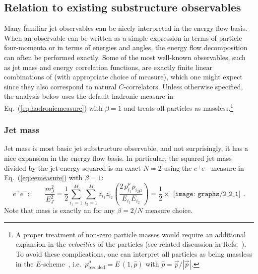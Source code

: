 \documentclass[letterpaper,11pt]{article}
\DeclareRobustCommand{\Eq}[1]{Eq.~(\ref{#1})}
\DeclareRobustCommand{\Refs}[1]{Refs.~\cite{#1}}
\newcommand{\B}{\text{EFP}\xspace}
\newcommand{\Bs}{\text{EFPs}\xspace}
\begin{document}
\subsection{Relation to existing substructure observables}
\label{sec:jetobs}

Many familiar jet observables can be nicely interpreted in the energy flow basis.
%
When an observable can be written as a simple expression in terms of particle four-momenta or in terms of energies and angles, the energy flow decomposition can often be performed exactly.
%
Some of the most well-known observables, such as jet mass and energy correlation functions, are exactly finite linear combinations of \Bs (with appropriate choice of measure), which one might expect since they also correspond to natural $C$-correlators.
%
Unless otherwise specified, the analysis below uses the default hadronic measure in \Eq{eq:hadronicmeasure} with $\beta=1$ and treats all particles as massless.\footnote{A proper treatment of non-zero particle masses would require an additional expansion in the \emph{velocities} of the particles (see related discussion in \Refs{Salam:2001bd,Mateu:2012nk}). To avoid these complications, one can interpret all particles as being massless in the $E$-scheme~\cite{Salam:2001bd}, i.e.\ $p_{\text{rescaled}}^\mu = E \, (1, \hat{p})$ with $\hat{p} = \vec{p} / |\vec{p}^{}|$.}


\subsubsection{Jet mass}
\label{sec:relation_jetmass}

Jet mass is most basic jet substructure observable, and not surprisingly, it has a nice expansion in the energy flow basis.
%
In particular, the squared jet mass divided by the jet energy squared is an exact $N=2$ \B using the $e^+e^-$ measure in \Eq{eq:eemeasure} with $\beta = 1$:
%
\begin{equation}\label{eq:massexp}
e^+e^-: \qquad \frac{m_J^2}{E_J^2}=\frac12\sum_{i_1 = 1}^M \sum_{i_2 = 1}^M z_{i_1}z_{i_2} \left(\frac{2\,p_{i_1}^\mu p_{i_2\mu}}{E_{i_1} E_{i_2}} \right) =\frac12\times
\begin{gathered}
\texttt{[image: graphs/2\_2\_1]}
\end{gathered}.
\end{equation}
%
Note that mass is exactly an \B for any $\beta = 2 / N$ measure choice.
\end{document}
